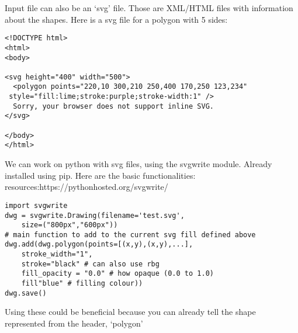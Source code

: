 \documentclass{article}
\begin{document}
Input file can also be an `svg' file. Those are XML/HTML files with information about the shapes. Here is a svg file for a polygon with 5 sides:
\begin{verbatim}
<!DOCTYPE html>
<html>
<body>

<svg height="400" width="500">
  <polygon points="220,10 300,210 250,400 170,250 123,234"
 style="fill:lime;stroke:purple;stroke-width:1" />
  Sorry, your browser does not support inline SVG.
</svg>

</body>
</html>
\end{verbatim}

We can work on python with svg files, using the svgwrite module. Already installed using pip. Here are the basic functionalities:\\

resources:{https://pythonhosted.org/svgwrite/}

\begin{verbatim}
import svgwrite
dwg = svgwrite.Drawing(filename='test.svg',
	size=("800px","600px"))
# main function to add to the current svg fill defined above
dwg.add(dwg.polygon(points=[(x,y),(x,y),...],
	stroke_width="1",
	stroke="black" # can also use rbg
	fill_opacity = "0.0" # how opaque (0.0 to 1.0)
	fill"blue" # filling colour))
dwg.save()
\end{verbatim}

Using these could be beneficial because you can already tell the shape represented from the header, `polygon'\\
\end{document}

